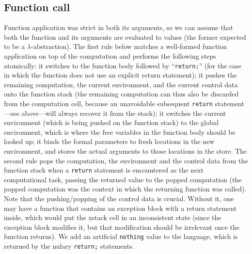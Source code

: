 \documentclass{article}
\begin{document}
\begin{kdefinition}
\begin{module}{}
\begin{kblock}[text]
 \subsection{Function call}
Function application was strict in both its arguments, so we can
assume that both the function and its arguments are evaluated to
values (the former expected to be a $\lambda$-abstraction).  The first
rule below matches a well-formed function application on top of the
computation and performs the following steps atomically: it switches
to the function body followed by ``\texttt{return;}'' (for the case in
which the function does not use an explicit return statement); it
pushes the remaining computation, the current environment, and the
current control data onto the function stack (the remaining
computation can thus also be discarded from the computation cell,
because an unavoidable subsequent \texttt{return} statement---see
above---will always recover it from the stack); it switches the
current environment (which is being pushed on the function stack) to
the global environment, which is where the free variables in the
function body should be looked up; it binds the formal parameters to
fresh locations in the new environment, and stores the actual
arguments to those locations in the store.  The second rule pops the
computation, the environment and the control data from the function
stack when a \texttt{return} statement is encountered as the next
computational task, passing the returned value to the popped
computation (the popped computation was the context in which the
returning function was called).  Note that the pushing/popping of the
control data is crucial.  Without it, one may have a function that
contains an exception block with a return statement inside, which
would put the \textsf{xstack} cell in an inconsistent state (since the
exception block modifies it, but that modification should be
irrelevant once the function returns).  We add an artificial
\texttt{nothing} value to the language, which is returned by the
nulary \texttt{return;} statements. \end{kblock}


\end{module}
\end{kdefinition}
\end{document}
